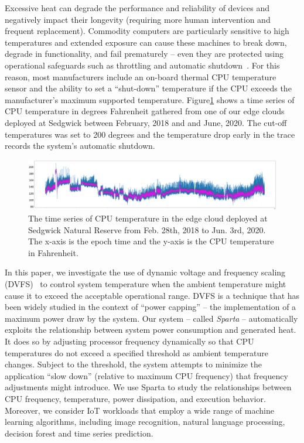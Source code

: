 Excessive heat can degrade the performance and reliability of devices and negatively
impact their longevity (requiring more human intervention and frequent
replacement). Commodity computers are particularly sensitive to high temperatures and
extended exposure can cause these machines to break down, degrade in functionality,
and fail prematurely -- even they are protected using operational safeguards
such as throttling and automatic shutdown~\cite{ref:overheating}.
For this reason, most manufacturers include an on-board thermal CPU
temperature sensor and the ability to set a ``shut-down'' temperature if the
CPU exceeds the manufacturer's maximum supported temperature.
Figure\ref{fig:time_series} shows a time series of CPU temperature in degrees Fahrenheit gathered
from one of
our edge clouds deployed at Sedgwick between February, 2018 and and June,
2020. The cut-off temperatures was set to 200 degrees and the temperature drop
early in the trace records the system's automatic shutdown.

\begin{figure}
\includegraphics[width=\textwidth]{figures/time_series.png}
\caption{The time series of CPU temperature in the edge cloud deployed at Sedgwick Natural Reserve from Feb. 28th, 2018 to Jun. 3rd, 2020. The x-axis is the epoch time and the y-axis is the CPU temperature in Fahrenheit. } \label{fig:time_series}
\end{figure}

In this paper, we investigate the use of dynamic voltage and frequency scaling
(DVFS)~\cite{ref:Liu2007dvfs,ref:Wang2010dvfs,ref:Deng2012dvfs,ref:Wu2013dvfs} to control system temperature when the ambient temperature
might cause it to exceed the acceptable operational range.  DVFS is a technique
that has been widely studied in the context of ``power capping'' -- the
implementation of a maximum power draw by the system.  Our system -- called
\textit{Sparta} --  automatically exploits the relationship between system
power consumption and generated heat.  It does so by adjusting processor
frequency dynamically so that CPU temperatures do not exceed a specified
threshold as ambient temperature changes.  Subject to the threshold, the
system attempts to minimize the application ``slow down'' (relative to maximum
CPU frequency) that frequency adjustments might introduce.  
We use Sparta to study the relationships between CPU frequency,
temperature, power dissipation, and execution behavior. Moreover, we consider
IoT workloads that employ a wide range of machine learning algorithms,
including image recognition, natural language processing, decision forest and
time series prediction. 

